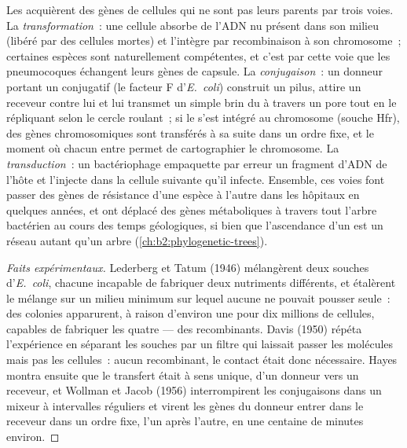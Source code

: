 \begin{definition}\label{def:b2:genome-diversification:hgt}
Les  acquièrent des gènes de cellules qui ne sont pas leurs
parents par trois voies. La \emph{transformation}~: une cellule absorbe
de l'ADN nu présent dans son milieu (libéré par des cellules mortes) et
l'intègre par recombinaison à son chromosome~; certaines espèces sont
naturellement compétentes, et c'est par cette voie que les pneumocoques
échangent leurs gènes de capsule. La \emph{conjugaison}~: un donneur
portant un  conjugatif (le facteur F
d'\emph{E.~coli}) construit un pilus, attire un receveur contre lui et
lui transmet un simple brin du  à travers un pore tout en le
répliquant selon le cercle roulant~; si le  s'est intégré au
chromosome (souche Hfr), des gènes chromosomiques sont transférés à sa
suite dans un ordre fixe, et le moment où chacun entre permet de
cartographier le chromosome. La \emph{transduction}~: un bactériophage
empaquette par erreur un fragment d'ADN de l'hôte et l'injecte dans la
cellule suivante qu'il infecte. Ensemble, ces voies font passer des
gènes de résistance d'une espèce à l'autre dans les hôpitaux en
quelques années, et ont déplacé des gènes métaboliques à travers tout
l'arbre bactérien au cours des temps géologiques, si bien que
l'ascendance d'un  est un réseau autant qu'un arbre
(\cref{ch:b2:phylogenetic-trees}).
\end{definition}
\begin{proof}[Faits expérimentaux]
Lederberg et Tatum (1946) mélangèrent deux souches d'\emph{E.~coli},
chacune incapable de fabriquer deux nutriments différents, et étalèrent
le mélange sur un milieu minimum sur lequel aucune ne pouvait pousser
seule~: des colonies apparurent, à raison d'environ une pour dix
millions de cellules, capables de fabriquer les quatre --- des
recombinants. Davis (1950) répéta l'expérience en séparant les souches
par un filtre qui laissait passer les molécules mais pas les cellules~:
aucun recombinant, le contact était donc nécessaire. Hayes montra
ensuite que le transfert était à sens unique, d'un donneur vers un
receveur, et Wollman et Jacob (1956) interrompirent les conjugaisons
dans un mixeur à intervalles réguliers et virent les gènes du donneur
entrer dans le receveur dans un ordre fixe, l'un après l'autre, en une
centaine de minutes environ.
\end{proof}

